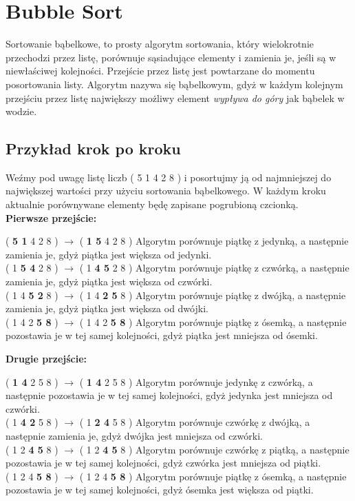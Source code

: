 \documentclass[knowledge.tex]{subfiles}
\begin{document}
    \section{Bubble Sort}
    Sortowanie bąbelkowe, to prosty algorytm sortowania, który wielokrotnie przechodzi przez listę, porównuje sąsiadujące elementy i zamienia je, jeśli są w niewłaściwej kolejności. Przejście przez listę jest powtarzane do momentu posortowania listy. Algorytm nazywa się bąbelkowym, gdyż w każdym kolejnym przejściu przez listę największy możliwy element \textit{wypływa do góry} jak bąbelek w wodzie.
    
    \subsection*{Przykład krok po kroku}
    Weźmy pod uwagę listę liczb ( 5 1 4 2 8 ) i posortujmy ją od najmniejszej do największej wartości przy użyciu sortowania bąbelkowego. W każdym kroku aktualnie porównywane elementy będę zapisane pogrubioną czcionką.\\[0.3cm]
    \textbf{Pierwsze przejście:}
    \begin{addmargin}[2em]{0em}
        ( \textbf{5 1} 4 2 8 ) $\rightarrow$ ( \textbf{1 5} 4 2 8 ) Algorytm porównuje piątkę z jedynką, a następnie zamienia je, gdyż piątka jest większa od jedynki.\\[0.1cm]
        ( 1 \textbf{5 4} 2 8 ) $\rightarrow$ ( 1 \textbf{4 5} 2 8 ) Algorytm porównuje piątkę z czwórką, a następnie zamienia je, gdyż piątka jest większa od czwórki.\\[0.1cm]
        ( 1 4 \textbf{5 2} 8 ) $\rightarrow$ ( 1 4 \textbf{2 5} 8 ) Algorytm porównuje piątkę z dwójką, a następnie zamienia je, gdyż piątka jest większa od dwójki.\\[0.1cm]
        ( 1 4 2 \textbf{5 8} ) $\rightarrow$ ( 1 4 2 \textbf{5 8} ) Algorytm porównuje piątkę z ósemką, a następnie pozostawia je w tej samej kolejności, gdyż piątka jest mniejsza od ósemki.\\[0.1cm]
    \end{addmargin}
    \textbf{Drugie przejście:}
    \begin{addmargin}[2em]{0em}
        ( \textbf{1 4} 2 5 8 ) $\rightarrow$ ( \textbf{1 4} 2 5 8 ) Algorytm porównuje jedynkę z czwórką, a następnie pozostawia je w tej samej kolejności, gdyż jedynka jest mniejsza od czwórki.\\[0.1cm]
        ( 1 \textbf{4 2} 5 8 ) $\rightarrow$ ( 1 \textbf{2 4} 5 8 ) Algorytm porównuje czwórkę z dwójką, a następnie zamienia je, gdyż dwójka jest mniejsza od czwórki.\\[0.1cm]
        ( 1 2 \textbf{4 5} 8 ) $\rightarrow$ ( 1 2 \textbf{4 5} 8 ) Algorytm porównuje czwórkę z piątką, a następnie pozostawia je w tej samej kolejności, gdyż czwórka jest mniejsza od piątki.\\[0.1cm]
        ( 1 2 4 \textbf{5 8} ) $\rightarrow$ ( 1 2 4 \textbf{5 8} ) Algorytm porównuje piątkę z ósemką, a następnie pozostawia je w tej samej kolejności, gdyż ósemka jest większa od piątki.\\[0.1cm]
    \end{addmargin}
\end{document}
